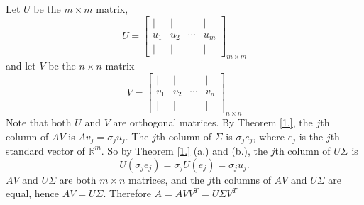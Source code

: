 \documentclass[12pt]{article}
\theoremstyle{definition}
\begin{document}
Let $U$ be the $m\times m$ matrix, \[U=
\begin{bmatrix}
    |&|& &|\\
    u_1&u_2&\cdots&u_m\\
    |&|& &|
\end{bmatrix}_{m\times m}\]
 and let $V$ be the $n\times n$ matrix\[V=
 \begin{bmatrix}
    |&|& &|\\
    v_1&v_2&\cdots&v_n\\
    |&|& &|
\end{bmatrix}_{n\times n}\] 
Note that both $U$ and $V$ are orthogonal matrices. By Theorem \ref{1.}, the $j$th column of $AV$ is $Av_j=\sigma_j u_j$. The $j$th column of $\Sigma$ is $\sigma_j e_j$, where $e_j$ is the $j$th standard vector of $\mathbb{R}^m$. So by Theorem \ref{1.} (a.) and (b.), the $j$th column of $U\Sigma$ is 
\[U(\sigma_j e_j)=\sigma_jU(e_j)=\sigma_j u_j.\]
$AV$ and $U\Sigma$ are both $m\times n$ matrices, and the $j$th columns of $AV$ and $U\Sigma$ are equal, hence $AV=U\Sigma$. Therefore $A=AVV^T=U\Sigma V^T$
\end{document}

